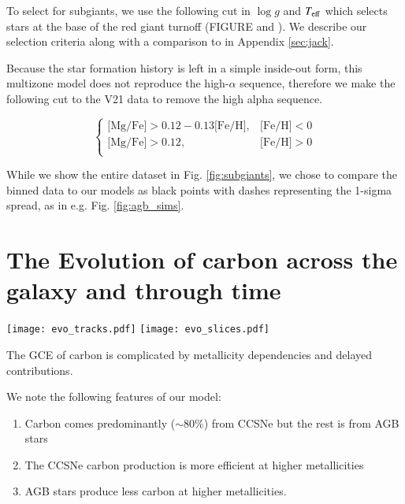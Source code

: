 \documentclass[12pt,oneside]{book}
\newcommand{\caah}{[C/Mg]-[Mg/H]}
\newcommand{\caafe}{[C/Mg]-[Mg/Fe]}
\begin{document}
To select for subgiants, we use the following cut in $\log g$ and $T_{\rm eff}$
which selects stars at the base of the red giant turnoff (FIGURE and
\cite{jack_subgiant}). We describe our selection criteria along with a 
comparison to \citet{fiorenzo+21} in Appendix \ref{sec:jack}. 

Because the star formation history is left in a simple inside-out form, this multizone model does not reproduce the high-$\alpha$ sequence, therefore we make the following cut to the V21 data to remove the high alpha sequence.

\begin{equation}
\begin{cases}
\text{[Mg/Fe]} >0.12-0.13\text{[Fe/H]}, & \text{[Fe/H]}<0\\
\text{[Mg/Fe]} >0.12, & \text{[Fe/H]}>0\\
\end{cases}
\end{equation}

While we show the entire dataset in Fig. \ref{fig:subgiants}, we chose to compare the
binned data to our models as black points with dashes representing the 1-sigma
spread, as in e.g. Fig. \ref{fig:agb_sims}. 



\section{The Evolution of carbon across the galaxy and through time}

\begin{figure*}
\label{fig:c_evo}
\texttt{[image: evo\_tracks.pdf]}
\texttt{[image: evo\_slices.pdf]}
\caption{The top set of panes show the time evolution of the gas phase of our
    fiducial model, plotted as tracks through \caah and \caafe where each colored line corresponds to the evolution at that galactic radius. 
The bottom set instead shows the galaxies gas-phase \caah and \caafe trend at 5 different time slices. 
}
\end{figure*}


The GCE of carbon is complicated by metallicity dependencies and delayed contributions. 

We note the following features of our model:

\begin{enumerate}
    \item Carbon comes predominantly ($\sim80\%$) from CCSNe but the rest is from AGB stars
    \item The CCSNe carbon production is more efficient at higher metallicities
    \item AGB stars produce less carbon at higher metallicities.
\end{enumerate}
\end{document}
